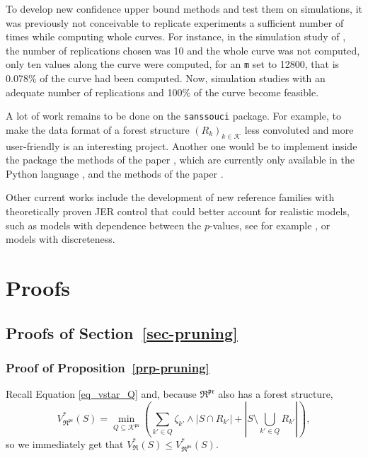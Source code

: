 \documentclass[
  11pt,
  a4paper,
]{article}
\theoremstyle{plain}
\theoremstyle{definition}
\theoremstyle{plain}
\theoremstyle{definition}
\theoremstyle{plain}
\theoremstyle{remark}
\begin{document}
To develop new confidence upper bound methods and test them on
simulations, it was previously not conceivable to replicate experiments
a sufficient number of times while computing whole curves. For instance,
in the simulation study of \citet{MR4178188}, the number of replications
chosen was 10 and the whole curve was not computed, only ten values
along the curve were computed, for an \texttt{m} set to 12800, that is
0.078\% of the curve had been computed. Now, simulation studies with an
adequate number of replications and 100\% of the curve become feasible.

A lot of work remains to be done on the \texttt{sanssouci} package. For
example, to make the data format of a forest structure
\((R_k)_{k\in\mathcal{K}}\) less convoluted and more user-friendly is an
interesting project. Another one would be to implement inside the
package the methods of the paper \citet{blain22notip}, which are
currently only available in the Python language \citep{10.5555/1593511},
and the methods of the paper \citet{JMLR:v25:23-1025}.

Other current works include the development of new reference families
with theoretically proven JER control that could better account for
realistic models, such as models with dependence between the
\(p\)-values, see for example \citet{perrot2023selective}, or models
with discreteness.

\section{Proofs}\label{sec-proofs}

\subsection{\texorpdfstring{Proofs of
Section~\ref{sec-pruning}}{Proofs of Section~}}\label{sec-pruning-proofs}

\subsubsection{\texorpdfstring{Proof of
Proposition~\ref{prp-pruning}}{Proof of Proposition~}}\label{sec-pruning-proofs-pruning}

Recall Equation \eqref{eq_vstar_Q} and, because
\(\mathfrak{R}^{\mathfrak{pr}}\) also has a forest structure,
\begin{equation}
V^*_{\mathfrak{R}^{\mathfrak{pr}}}(S)=\min_{Q\subseteq\mathcal{K}^{\mathfrak{pr}}}\left(\sum_{k'\in Q}\zeta_{k'}\wedge|S\cap R_{k'}|+\left| S\setminus\bigcup_{k'\in Q} R_{k'}   \right|\right),
\label{eq_vstarpruned_Q}
\end{equation} so we immediately get that
\(V^*_{\mathfrak{R}}(S)\leq V^*_{\mathfrak{R}^{\mathfrak{pr}}}(S)\).
\end{document}
